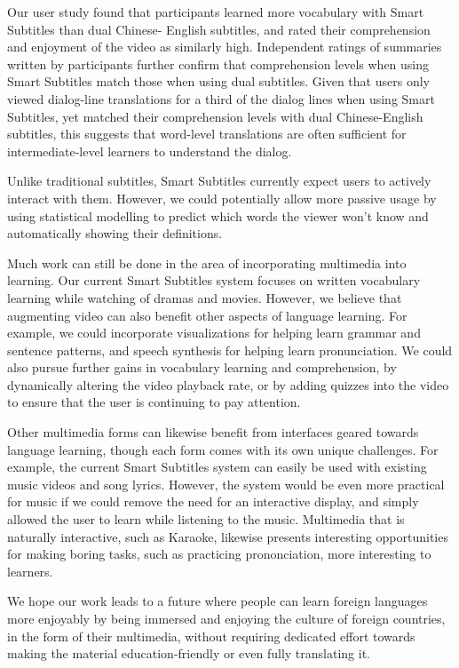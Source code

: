 \documentclass{sigchi}
\begin{document}
Our user study found that participants learned more
vocabulary with Smart Subtitles than dual Chinese-
English subtitles, and rated their comprehension and
enjoyment of the video as similarly high.
Independent ratings of summaries written by participants
further confirm that comprehension levels when using Smart Subtitles
match those when using dual subtitles.
Given that users only viewed dialog-line translations for a
third of the dialog lines when using Smart Subtitles,
yet matched their comprehension levels with dual Chinese-English subtitles,
this suggests that word-level translations are often sufficient for
intermediate-level learners to understand the dialog.

Unlike traditional subtitles, Smart Subtitles currently expect users to actively interact with them. However, we could potentially allow more
passive usage by using statistical modelling to predict which words the viewer
won’t know and automatically showing their definitions.

Much work can still be done in the area of incorporating multimedia into learning. Our current Smart Subtitles system focuses on written vocabulary learning while watching of dramas and movies.
However, we believe that augmenting video can also benefit other aspects of language learning. For example, we could
incorporate visualizations for helping learn grammar and sentence patterns,
and speech synthesis for helping learn pronunciation. We could also 
pursue further gains in vocabulary learning and comprehension,
by dynamically altering the video playback rate, or by adding
quizzes into the video to ensure that the user is continuing to pay attention.

Other multimedia forms can likewise benefit from interfaces geared
towards language learning, though each form comes with its own
unique challenges. For example, the current Smart Subtitles system can
easily be used with existing music videos and song lyrics.
However, the system would be even more practical for music if
we could remove the need for an interactive display, and simply
allowed the user to learn while listening to the music.
Multimedia that is naturally interactive, such as Karaoke,
likewise presents interesting opportunities for
making boring tasks, such as practicing prononciation, more interesting
to learners.

We hope our work leads to a future where people can learn foreign languages more enjoyably by being immersed and enjoying the culture of foreign countries, in the form of their multimedia, without requiring dedicated effort towards making the material education-friendly or even fully translating it.

\balance





\end{document}
